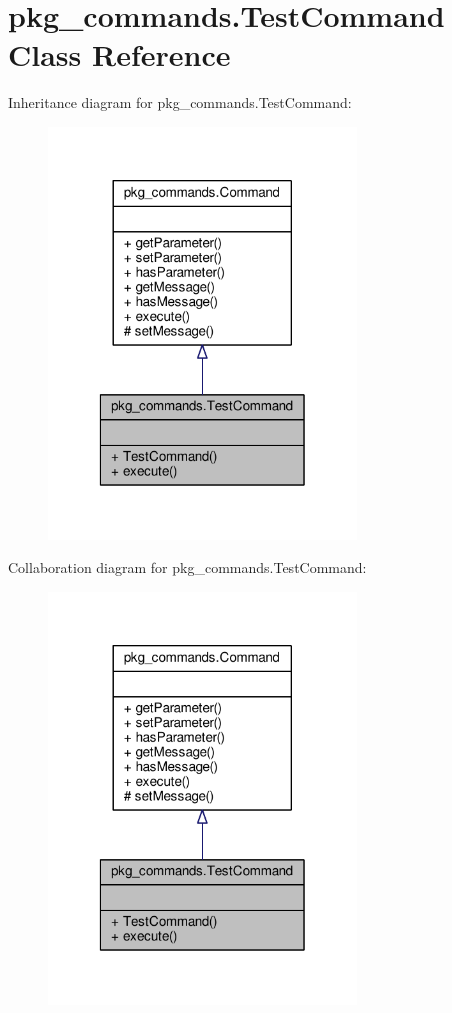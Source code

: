 \hypertarget{classpkg__commands_1_1TestCommand}{\section{pkg\-\_\-commands.\-Test\-Command Class Reference}
\label{classpkg__commands_1_1TestCommand}
}


Inheritance diagram for pkg\-\_\-commands.\-Test\-Command\-:
\nopagebreak
\begin{figure}[H]
\begin{center}
\leavevmode
\includegraphics[width=232pt]{classpkg__commands_1_1TestCommand__inherit__graph}
\end{center}
\end{figure}


Collaboration diagram for pkg\-\_\-commands.\-Test\-Command\-:
\nopagebreak
\begin{figure}[H]
\begin{center}
\leavevmode
\includegraphics[width=232pt]{classpkg__commands_1_1TestCommand__coll__graph}
\end{center}
\end{figure}
